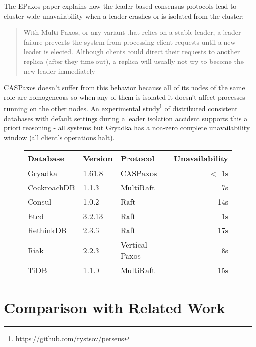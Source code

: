 \documentclass[a4paper,USenglish]{lipics-v2018}
\theoremstyle{definition}
\begin{document}
    The EPaxos paper explains how the leader-based consensus protocols lead to cluster-wide unavailability when a leader crashes or is isolated from the cluster:

    \begin{quote}
    With Multi-Paxos, or any variant that relies on a stable leader, a leader failure prevents the system from processing client requests until a new leader is elected. Although clients could direct their requests to another replica (after they time out), a replica will usually not try to become the new leader immediately
    \end{quote}

    CASPaxos doesn't suffer from this behavior because all of its nodes of the same role are homogeneous so when any of them is isolated it doesn't affect processes running on the other nodes. An experimental study\footnote{\href{https://github.com/rystsov/perseus}{https://github.com/rystsov/perseus}} of distributed consistent databases with default settings during a leader isolation accident supports this a priori reasoning - all systems but Gryadka has a non-zero complete unavailability window (all client's operations halt).

    \begin{figure}[!h]
        \centering
        \begin{tabular}{|l|l|l|r|}
            \hline
            Database & Version & Protocol & Unavailability\\
            \hline
            \hline
            Gryadka & 1.61.8 & CASPaxos & $<$ 1s\\
            \hline
            CockroachDB & 1.1.3 & MultiRaft & 7s\\
            Consul & 1.0.2 & Raft & 14s\\
            Etcd & 3.2.13 & Raft & 1s\\
            RethinkDB & 2.3.6 & Raft & 17s\\
            Riak & 2.2.3 & Vertical Paxos & 8s\\
            TiDB & 1.1.0 & MultiRaft & 15s\\
            \hline
        \end{tabular}
    \end{figure}

\section{Comparison with Related Work}
\end{document}
